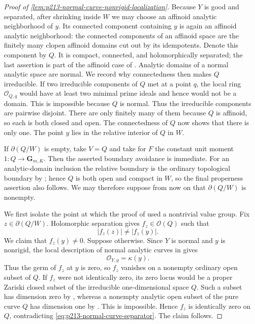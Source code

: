
\begin{proof}[Proof of
\cref{lem:p213-normal-curve-nonrigid-localization}]
Because $Y$ is good and separated, after shrinking inside $W$ we may
choose an affinoid analytic neighborhood of $y$.  Its connected component
containing $y$ is again an affinoid analytic neighborhood: the connected
components of an affinoid space are the finitely many clopen affinoid
domains cut out by its idempotents.  Denote this component by $Q$.  It is
compact, connected, and holomorphically separated; the last assertion is
part of the affinoid case of \cite[\S15.2.2]{CLD25}.  Analytic domains of a
normal analytic space are normal.  We record why connectedness then makes
$Q$ irreducible.  If two irreducible components of $Q$ met at a point
$q$, the local ring $\mathcal O_{Q,q}$ would have at least two minimal
prime ideals and hence would not be a domain.  This is impossible because
$Q$ is normal.  Thus the irreducible components are pairwise disjoint.
There are only finitely many of them because $Q$ is affinoid, so each is
both closed and open.  The connectedness of $Q$ now shows that there is
only one.  The point $y$ lies in the relative interior of $Q$ in $W$.

If $\partial(Q/W)$ is empty, take $V=Q$ and take for $F$ the constant unit
moment $1:Q\to\mathbf G_{m,K}$.  Then the asserted boundary avoidance is
immediate.  For an analytic-domain inclusion the relative boundary is the
ordinary topological boundary by \cite[\S11.4.1]{CLD25}; hence $Q$ is both
open and compact in $W$, so the final properness assertion also follows.
We may therefore suppose from now on that $\partial(Q/W)$ is nonempty.

We first isolate the point at which the proof of
\cite[Lemma~12.3.6]{CLD25} used a nontrivial value group.  Fix
$z\in\partial(Q/W)$.  Holomorphic separation gives
$f_z\in\mathcal O(Q)$ such that
\begin{equation}
\label{eq:p213-normal-curve-separator}
                         |f_z(z)|\ne|f_z(y)|.
\end{equation}
We claim that $f_z(y)\ne0$.  Suppose otherwise.  Since $Y$ is normal and
$y$ is nonrigid, the local description of normal analytic curves in
\cite[\S4.2.18]{Ducros24CurveStructure} gives
\[
                         \mathcal O_{Y,y}=\kappa(y).
\]
Thus the germ of $f_z$ at $y$ is zero, so $f_z$ vanishes on a nonempty
ordinary open subset of $Q$.  If $f_z$ were not identically zero, its zero
locus would be a proper Zariski closed subset of the irreducible
one-dimensional space $Q$.  Such a subset has dimension zero by
\cite[\S11.2.5]{CLD25}, whereas a nonempty analytic open subset of the pure
curve $Q$ has dimension one by \cite[\S11.2.3]{CLD25}.
This is impossible.  Hence $f_z$ is identically zero on $Q$, contradicting
\eqref{eq:p213-normal-curve-separator}.  The claim follows.


\end{proof}
